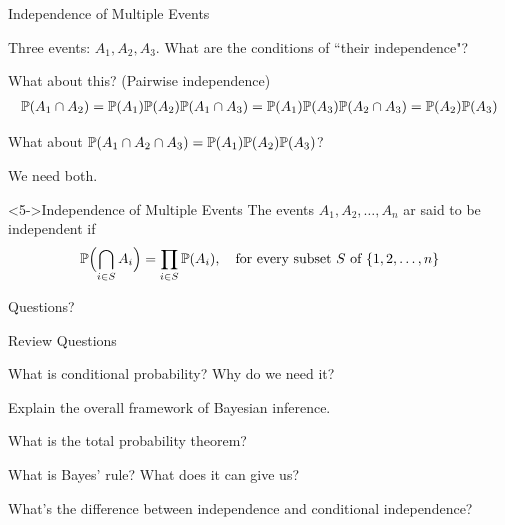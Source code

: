 \documentclass[fleqn,aspectratio=169]{beamer}
\begin{document}
\begin{frame}{Independence of Multiple Events}

\plitemsep 0.1in
\bci 

\item<1-> Three events: $A_1, A_2, A_3.$ What are the conditions of ``their independence"?

\item<2-> What about this? (Pairwise independence)
\begin{align*}
\mathbb{P}( A_1 \cap A_2 ) = \mathbb{P}( A_1 ) \mathbb{P}( A_2 )
\mathbb{P}( A_1 \cap A_3 ) = \mathbb{P}( A_1 ) \mathbb{P}( A_3 )
\mathbb{P}( A_2 \cap A_3 ) = \mathbb{P}( A_2 ) \mathbb{P}( A_3 )
\end{align*}

\item<3-> What about $\mathbb{P}( A_1 \cap A_2 \cap A_3 ) = \mathbb{P}( A_1 ) \mathbb{P}( A_2 ) \mathbb{P}( A_3 )$?

\item<4-> We need both. 

\begin{block}<5->{Independence of Multiple Events}
The events $A_1,A_2, \ldots, A_n$ ar said to be independent if
$$
\mathbb{P}\Bigl( \bigcap_{i \in S} A_i \Bigr) = \prod_{i \in S} \mathbb{P}( A_i ), \quad \text{for every subset } S \text{ of } \{1,2, \ldots, n \}
$$
\end{block}
\eci 
\end{frame}


\begin{frame}{}
\vspace{2cm}
\LARGE Questions?

\end{frame}

\begin{frame}{Review Questions}
\bce[1)]
\item What is conditional probability? Why do we need it?

\item Explain the overall framework of Bayesian inference.

\item What is the total probability theorem?

\item What is Bayes' rule? What does it can give us?

\item What's the difference between independence and conditional independence?

\ece
\end{frame}
\end{document}
